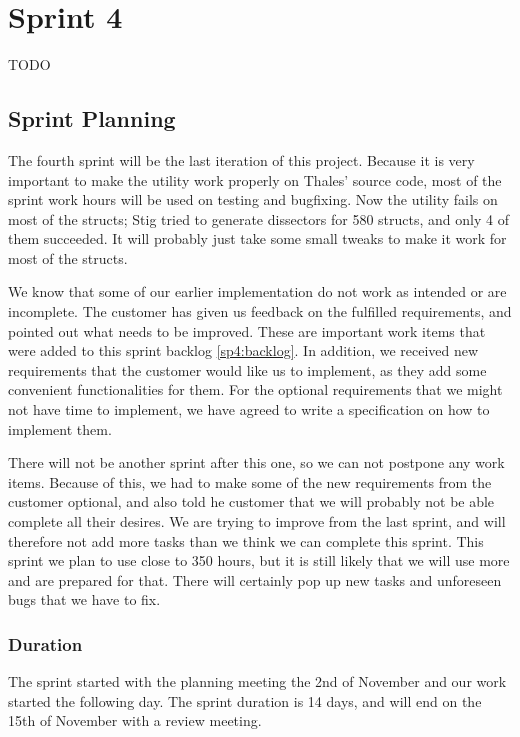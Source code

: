 \chapter{Sprint 4}
TODO

\section{Sprint Planning}
The fourth sprint will be the last iteration of this project. Because it is very important to make the \gls{utility} work properly on Thales' source code, most of the sprint work hours will be used on testing and bugfixing. Now the \gls{utility} fails on most of the \glspl{struct}; Stig tried to generate \glspl{dissector} for 580 \glspl{struct}, and only 4 of them succeeded. It will probably just take some small tweaks to make it work for most of the \glspl{struct}.

We know that some of our earlier implementation do not work as intended or are incomplete. The customer has given us feedback on the fulfilled requirements, and pointed out what needs to be improved. These are important work items that were added to this sprint backlog \ref{sp4:backlog}. In addition, we received new requirements that the customer would like us to implement, as they add some convenient functionalities for them. For the optional requirements that we might not have time to implement, we have agreed to write a specification on how to implement them. 

There will not be another sprint after this one, so we can not postpone any work items. Because of this, we had to make some of the new requirements from the customer optional, and also told he customer that we will probably not be able complete all their desires. We are trying to improve from the last sprint, and will therefore not add more tasks than we think we can complete this sprint. This sprint we plan to use close to 350 hours, but it is still likely that we will use more and are prepared for that. There will certainly pop up new tasks and unforeseen bugs that we have to fix.

\subsection{Duration}
The sprint started with the planning meeting the 2nd of November and our work started the following day. The sprint duration is 14 days, and will end on the 15th of November with a review meeting. 


